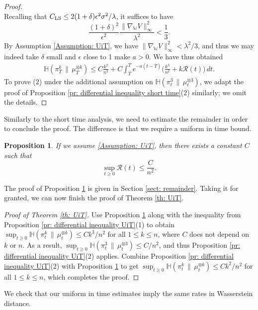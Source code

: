 \documentclass[11pt,reqno]{amsart}
\numberwithin{equation}{section}
\newtheorem{proposition}[theorem]{Proposition}
\theoremstyle{definition}
\newcommand{\wgrad}{\nabla_{\W}}
\newcommand{\W}{\mathbb W}
\newcommand{\ent}{ \mathbb H}
\begin{document}
\begin{proof}
\[\]
Recalling that $C_{\textup{LS}}\le 2(1+\delta)\epsilon^2\sigma^2/\lambda$, it suffices to have
\[
\frac{(1+\delta)^2}{\epsilon^2} \frac{\|\wgrad V\|_\infty^2}{\lambda^2} < \frac13.
\]
By Assumption \ref{Assumption: UiT}, we have $\|\wgrad V\|_\infty^2 < \lambda^2/3$, and thus we may indeed take $\delta$ small and $\epsilon$ close to 1 make $a > 0$.
We have thus obtained
\begin{align*}
    \ent(\pi_T^k\,\|\,\mu_T^{\otimes k})\leq C\frac{k^2}{n^2} + C\int_{\overline T}^{T}e^{-a(t-\overline T)}\Big(\frac{k^3}{n^2}+k \mathcal R(t)\Big)\,dt.
\end{align*}
To prove (2) under the additional assumption on $\ent(\pi_t^3\,\|\,\mu_t^{\otimes 3})$, we adapt the proof of Proposition \ref{pr: differential inequality short time}(2) similarly; we omit the details.
\end{proof}

Similarly to the short time analysis, we need to estimate the remainder in order to conclude the proof. The difference is that we require a uniform in time bound.
\begin{proposition}
\label{pr: remainder UIT}
    If we assume \ref{Assumption: UiT}, then there exists a constant $C$ such that
    \[\sup_{t\geq 0} \mathcal R(t)\leq \frac{C}{n^2}.\]
\end{proposition}


The proof of Proposition \ref{pr: remainder UIT} is given in Section \ref{sect: remainder}. Taking it for granted, we can now finish the proof of Theorem \ref{th: UiT}.

\begin{proof}[Proof of Theorem \ref{th: UiT}]
Use Proposition \ref{pr: remainder UIT} along with the inequality from Proposition \ref{pr: differential inequality UiT}(1) to obtain  $\sup_{t \ge 0}\ent (\pi^k_t\,\|\,\mu^{\otimes k}_t) \leq Ck^3/n^2$ for all $1 \le k \le n$, 
    where $C$ does not depend on $k$ or $n$. As a result, $\sup_{t \ge 0}\ent (\pi^3_t\,\|\,\mu^{\otimes 3}_t)\leq C/n^2$, and thus Proposition \ref{pr: differential inequality UiT}(2) applies. Combine Proposition \ref{pr: differential inequality UiT}(2) with Proposition \ref{pr: remainder UIT} to get  $\sup_{t \ge 0}\ent (\pi^k_t\,\|\,\mu^{\otimes k}_t) \leq Ck^2/n^2$ for all $1 \le k \le n$, which completes the proof.
\end{proof}

 

We check that our uniform in time estimates imply the same rates in Wasserstein distance.
\end{document}
